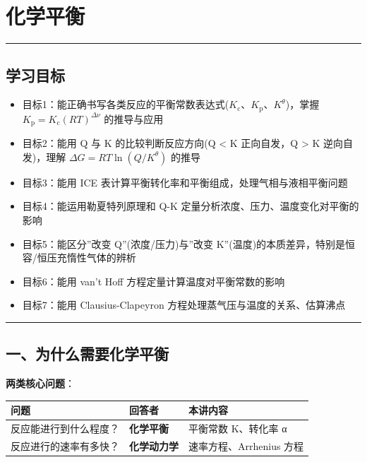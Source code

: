\section{化学平衡}\label{ux5316ux5b66ux5e73ux8861}

\begin{center}\rule{0.5\linewidth}{0.5pt}\end{center}

\subsection{学习目标}\label{ux5b66ux4e60ux76eeux6807}

\begin{itemize}
\tightlist
\item
  目标1：能正确书写各类反应的平衡常数表达式(\(K_{\mathrm c}\)、\(K_{\mathrm p}\)、\(K^\theta\))，掌握 \(K_{\mathrm p} = K_{\mathrm c}(RT)^{\Delta\nu}\) 的推导与应用
\item
  目标2：能用 Q 与 K 的比较判断反应方向(Q \textless{} K 正向自发，Q \textgreater{} K 逆向自发)，理解 \(\Delta G = RT \ln(Q/K^\theta)\) 的推导
\item
  目标3：能用 ICE 表计算平衡转化率和平衡组成，处理气相与液相平衡问题
\item
  目标4：能运用勒夏特列原理和 Q-K 定量分析浓度、压力、温度变化对平衡的影响
\item
  目标5：能区分''改变 Q''(浓度/压力)与''改变 K''(温度)的本质差异，特别是恒容/恒压充惰性气体的辨析
\item
  目标6：能用 van't Hoff 方程定量计算温度对平衡常数的影响
\item
  目标7：能用 Clausius-Clapeyron 方程处理蒸气压与温度的关系、估算沸点
\end{itemize}

\begin{center}\rule{0.5\linewidth}{0.5pt}\end{center}

\subsection{一、为什么需要化学平衡}\label{ux4e00ux4e3aux4ec0ux4e48ux9700ux8981ux5316ux5b66ux5e73ux8861}

\textbf{两类核心问题}：

{\def\LTcaptype{none} %
\begin{longtable}[]{@{}lll@{}}
\toprule\noalign{}
问题 & 回答者 & 本讲内容 \\
\midrule\noalign{}
\endhead
\bottomrule\noalign{}
\endlastfoot
反应能进行到什么程度？ & \textbf{化学平衡} & 平衡常数 K、转化率 α \\
反应进行的速率有多快？ & \textbf{化学动力学} & 速率方程、Arrhenius 方程 \\
\end{longtable}
}

